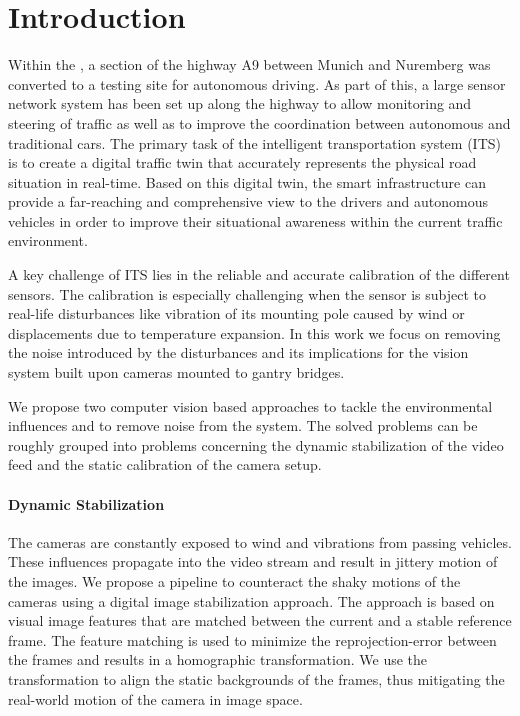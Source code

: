 
\section{Introduction}

Within the \Providentia{}, a section of the highway A9 between Munich and Nuremberg was converted to a testing site for autonomous driving. 
As part of this, a large sensor network system has been set up along the highway to allow monitoring and steering of traffic as well as to improve the coordination between autonomous and traditional cars. 
The primary task of the intelligent transportation system (ITS) is to create a digital traffic twin that accurately represents the physical road situation in real-time. 
Based on this digital twin, the smart infrastructure can provide a far-reaching and comprehensive view to the drivers and autonomous vehicles in order to improve their situational awareness within the current traffic environment.

A key challenge of ITS lies in the reliable and accurate calibration of the different sensors.
The calibration is especially challenging when the sensor is subject to real-life disturbances like vibration of its mounting pole caused by wind or displacements due to temperature expansion.
In this work we focus on removing the noise introduced by the disturbances and its implications for the vision system built upon cameras mounted to gantry bridges.

We propose two computer vision based approaches to tackle the environmental influences and to remove noise from the system.
The solved problems can be roughly grouped into problems concerning the dynamic stabilization of the video feed and the static calibration of the camera setup.

\paragraph{Dynamic Stabilization}
The cameras are constantly exposed to wind and vibrations from passing vehicles.
These influences propagate into the video stream and result in jittery motion of the images.
We propose a pipeline to counteract the shaky motions of the cameras using a digital image stabilization approach.
The approach is based on visual image features that are matched between the current and a stable reference frame. 
The feature matching is used to minimize the reprojection-error between the frames and results in a homographic transformation.
We use the transformation to align the static backgrounds of the frames, thus mitigating the real-world motion of the camera in image space.

